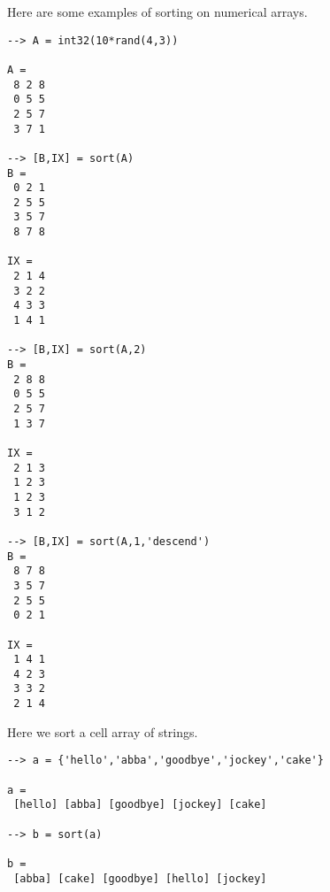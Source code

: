 Here are some examples of sorting on numerical arrays.
\begin{verbatim}
--> A = int32(10*rand(4,3))

A = 
 8 2 8 
 0 5 5 
 2 5 7 
 3 7 1 

--> [B,IX] = sort(A)
B = 
 0 2 1 
 2 5 5 
 3 5 7 
 8 7 8 

IX = 
 2 1 4 
 3 2 2 
 4 3 3 
 1 4 1 

--> [B,IX] = sort(A,2)
B = 
 2 8 8 
 0 5 5 
 2 5 7 
 1 3 7 

IX = 
 2 1 3 
 1 2 3 
 1 2 3 
 3 1 2 

--> [B,IX] = sort(A,1,'descend')
B = 
 8 7 8 
 3 5 7 
 2 5 5 
 0 2 1 

IX = 
 1 4 1 
 4 2 3 
 3 3 2 
 2 1 4 
\end{verbatim}
Here we sort a cell array of strings.
\begin{verbatim}
--> a = {'hello','abba','goodbye','jockey','cake'}

a = 
 [hello] [abba] [goodbye] [jockey] [cake] 

--> b = sort(a)

b = 
 [abba] [cake] [goodbye] [hello] [jockey] 
\end{verbatim}
